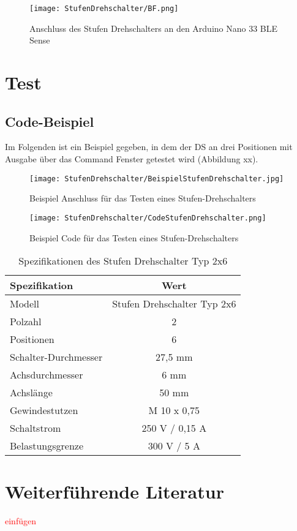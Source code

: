 \begin{figure}[H]
	\centering
	\texttt{[image: StufenDrehschalter/BF.png]}
	\caption{Anschluss des Stufen Drehschalters an den Arduino Nano 33 BLE Sense}
	\label{fig:AnschlussArduinoDS}
\end{figure}

\section{Test}

\subsection{Code-Beispiel}

Im Folgenden ist ein Beispiel gegeben, in dem der DS an drei Positionen mit Ausgabe über das Command Fenster getestet wird (Abbildung xx).

\begin{figure}[H]
	\centering
	\texttt{[image: StufenDrehschalter/BeispielStufenDrehschalter.jpg]}
	\caption{Beispiel Anschluss für das Testen eines Stufen-Drehschalters}
	\label{fig:CodeStufenDrehschalter}
\end{figure}

\begin{figure}[H]
	\centering
	\texttt{[image: StufenDrehschalter/CodeStufenDrehschalter.png]}
	\caption{Beispiel Code für das Testen eines Stufen-Drehschalters}
	\label{fig:CodeStufenDrehschalter}
\end{figure}

\begin{comment}
\begin{code}[H]
	\caption{Einfacher Code zum Testen des Stufen-Drehschalters}
	\label{code:StufenDrehschalter}
	\ArduinoExternal{}{../../Code/Arduino/StufenDrehschalter}
\end{code}
\end{comment}


\begin{table}[H]
	\centering
	\begin{tabular}{|l|c|}
		\hline
		\textbf{Spezifikation} & \textbf{Wert} \\
		\hline
		Modell & Stufen Drehschalter Typ 2x6 \\
		Polzahl & 2 \\
		Positionen & 6 \\
		Schalter-Durchmesser & 27,5 mm \\
		Achsdurchmesser & 6 mm \\
		Achslänge & 50 mm \\
		Gewindestutzen & M 10 x 0,75 \\
		Schaltstrom & 250 V / 0,15 A  \\
		Belastungsgrenze & 300 V / 5 A   \\
		\hline
	\end{tabular}
	\caption{Spezifikationen des Stufen Drehschalter Typ 2x6}
	\label{tab:SpezifikationStufenDrehschalter}
\end{table}


\section{Weiterführende Literatur}

\textcolor{red}{einfügen}

